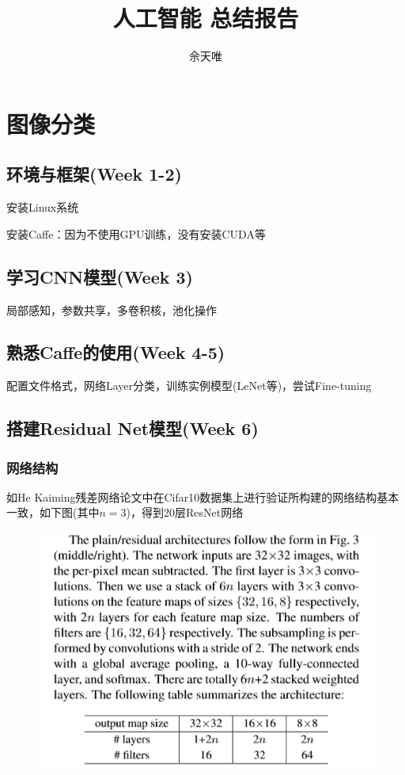 \documentclass[UTF8]{ctexart}
\title{人工智能 总结报告}
\author{佘天唯}
\begin{document}
	\maketitle	
	
	\section{图像分类}
	\subsection{环境与框架(Week 1-2)}
	安装Linux系统
	
	安装Caffe：因为不使用GPU训练，没有安装CUDA等
	\subsection{学习CNN模型(Week 3)}
	局部感知，参数共享，多卷积核，池化操作
	\subsection{熟悉Caffe的使用(Week 4-5)}
	配置文件格式，网络Layer分类，训练实例模型(LeNet等)，尝试Fine-tuning
	\subsection{搭建Residual Net模型(Week 6)}
		\subsubsection{网络结构}
		如He Kaiming残差网络论文中在Cifar10数据集上进行验证所构建的网络结构基本一致，如下图(其中$n=3$)，得到20层ResNet网络
		\begin{figure}[htbp]
			\centering
			\includegraphics[scale=0.8]{1.png}
		\end{figure}
		
\end{document}
